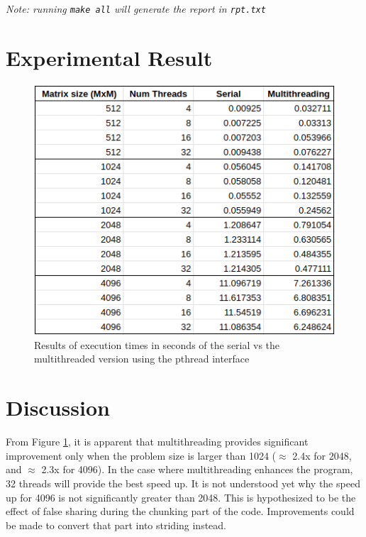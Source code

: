 \documentclass[letterpaper, 11pt]{article}
\begin{document}
\textit{Note: running \texttt{make all} will generate the report in \texttt{rpt.txt}}

\section{Experimental Result}

\begin{figure}[htb!]
	\centering
	\includegraphics[width=0.6\linewidth]{results.png}
	\caption{Results of execution times in seconds of the serial vs the multithreaded version using the pthread interface}
	\label{fig1}
\end{figure}

\section{Discussion}

From Figure \ref{fig1}, it is apparent that multithreading provides significant improvement only when the problem size is larger than 1024 ($\approx$ 2.4x for 2048, and $\approx$ 2.3x for 4096). In the case where multithreading enhances the program, 32 threads will provide the best speed up. It is not understood yet why the speed up for 4096 is not significantly greater than 2048. This is hypothesized to be the effect of false sharing during the chunking part of the code. Improvements could be made to convert that part into striding instead.
\end{document}
